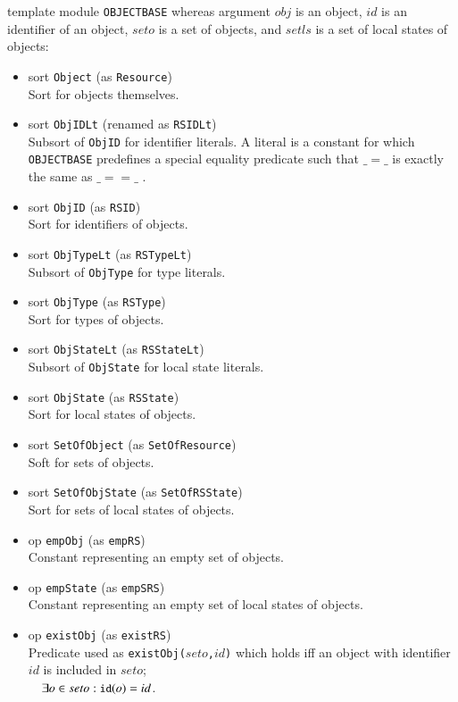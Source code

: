 \documentclass[12pt]{report}
\newcommand{\mbstt}[1]{\mbox{\small{\tt {#1}}}}
\newcommand{\stt}[1]{{\small{\tt {#1}}}}
\begin{document}
template module {\tt OBJECTBASE} whereas argument $obj$ is an object,
$id$ is an identifier of an object, $seto$ is a set of objects, and
$setls$ is a set of local states of objects:
\begin{itemize}
\item sort \stt{Object} (as \stt{Resource})\\
  Sort for objects themselves.
\item sort \stt{ObjIDLt} (renamed as \stt{RSIDLt})\\
  Subsort of {\tt ObjID} for identifier literals. A literal is a
  constant for which {\tt OBJECTBASE} predefines a special equality
  predicate such that $\_ = \_$ is exactly the same as $\_ == \_ $ .
\item sort \stt{ObjID} (as \stt{RSID})\\
  Sort for identifiers of objects.
\item sort \stt{ObjTypeLt} (as \stt{RSTypeLt})\\
  Subsort of {\tt ObjType} for type literals.
\item sort \stt{ObjType} (as \stt{RSType})\\
  Sort for types of objects.
\item sort \stt{ObjStateLt} (as \stt{RSStateLt})\\
  Subsort of {\tt ObjState} for local state literals.
\item sort \stt{ObjState} (as \stt{RSState})\\
  Sort for local states of objects.
\item sort \stt{SetOfObject} (as \stt{SetOfResource})\\
  Soft for sets of objects.
\item sort \stt{SetOfObjState} (as \stt{SetOfRSState})\\
  Sort for sets of local states of objects.
\item op \stt{empObj} (as \stt{empRS})\\
  Constant representing an empty set of objects.
\item op \stt{empState} (as \stt{empSRS})\\
  Constant representing an empty set of local states of objects.
\item op \stt{existObj} (as \stt{existRS})\\ 
  Predicate used as \stt{existObj($seto$,$id$)} which holds iff an
  object with identifier $id$ is included in $seto$;\\$~~~~\exists o\in
  seto: \mbstt{id}(o)=id$.

\end{itemize}
\end{document}
